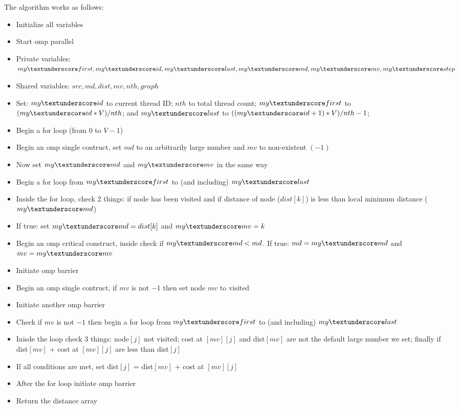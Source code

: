 	\newpage
	The algorithm works as follows:
	\begin{itemize}
		\item Initialize all variables
		\item Start omp parallel
		\item Private variables: $my\textunderscore first, my\textunderscore id, my\textunderscore last, my\textunderscore md, my\textunderscore mv, my\textunderscore step$
		\item Shared variables: $src, md, dist, mv, nth, graph$
		\item Set: $my\textunderscore id$ to current thread ID; $nth$ to total thread count; $my\textunderscore first$ to $(my\textunderscore id * V) / nth$; and $my\textunderscore last$ to $((my\textunderscore id + 1) * V) / nth - 1$;
		\item Begin a for loop (from $0$ to $V-1$)
		\item Begin an omp single contruct, set $md$ to an arbitrarily large number and $mv$ to non-existent $(-1)$
		\item Now set $my\textunderscore md$ and $my\textunderscore mv$ in the same way
		\item Begin a for loop from $my\textunderscore first$ to (and including) $my\textunderscore last$ 
		\item Inside the for loop, check 2 things: if node has been visited and if distance of node ($dist[k]$) is less than local minimum distance ($my\textunderscore md$)
		\item If true: set $my\textunderscore md = dist[k]$ and $my\textunderscore mv = k$
		\item Begin an omp critical construct, inside check if $my\textunderscore md < md$. If true: $md = my\textunderscore md$ and $mv = my\textunderscore mv$
		\item Initiate omp barrier
		\item Begin an omp single contruct, if $mv$ is not $-1$ then set node $mv$ to visited
		\item Initiate another omp barrier
		\item Check if $mv$ is not $-1$ then begin a for loop from $my\textunderscore first$ to (and including) $my\textunderscore last$ 
		\item Inisde the loop check 3 things: node$[j]$ not visited; cost at $[mv][j]$ and dist$[mv]$ are not the default large number we set; finally if dist$[mv]$ + cost at $[mv][j]$ are less than dist$[j]$
		\item If all conditions are met, set dist$[j]$ = dist$[mv]$ + cost at $[mv][j]$
		\item After the for loop initiate omp barrier
		\item Return the distance array
	\end{itemize}
	
